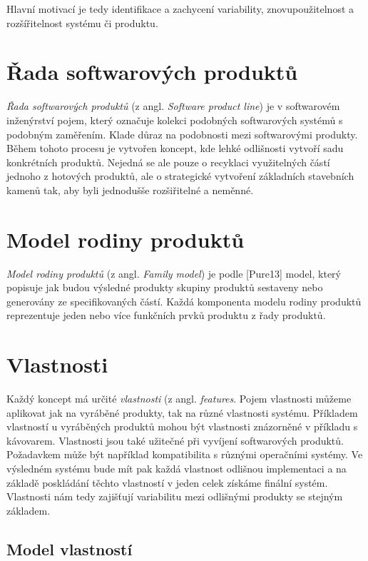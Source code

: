 Hlavní motivací je tedy identifikace a zachycení variability, znovupoužitelnost a rozšířitelnost systému či produktu.

\section{Řada softwarových produktů}

\textit{Řada softwarových produktů} (z angl. \textit{Software product line}) je v softwarovém inženýrství pojem, který označuje kolekci podobných softwarových systémů s podobným zaměřením. Klade důraz na podobnosti mezi softwarovými produkty. Během tohoto procesu je vytvořen koncept, kde lehké odlišnosti vytvoří sadu konkrétních produktů. Nejedná se ale pouze o recyklaci využitelných částí jednoho z hotových produktů, ale o strategické vytvoření základních stavebních kamenů tak, aby byli jednodušše rozšiřitelné a neměnné.

\section{Model rodiny produktů}

\textit{Model rodiny produktů} (z angl. \textit{Family model}) je podle [Pure13] model, který popisuje jak budou výsledné produkty skupiny produktů sestaveny nebo generovány ze specifikovaných částí. Každá komponenta modelu rodiny produktů reprezentuje jeden nebo více funkčních prvků produktu z řady produktů.

\section{Vlastnosti}

Každý koncept má určité \textit{vlastnosti} (z angl. \textit{features}. Pojem vlastnosti můžeme aplikovat jak na vyráběné produkty, tak na různé vlastnosti systému. Příkladem vlastností u vyráběných produktů mohou být vlastnosti znázorněné v příkladu s kávovarem. Vlastnosti jsou také užitečné při vyvíjení softwarových produktů. Požadavkem může být například kompatibilita s různými operačními systémy. Ve výsledném systému bude mít pak každá vlastnost odlišnou implementaci a na základě poskládání těchto vlastností v jeden celek získáme finální systém. Vlastnosti nám tedy zajišťují variabilitu mezi odlišnými produkty se stejným základem.

\subsection{Model vlastností}

